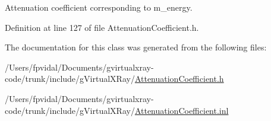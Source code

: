 Attenuation coefficient corresponding to m\_\-energy. 



Definition at line 127 of file AttenuationCoefficient.h.



The documentation for this class was generated from the following files:\begin{DoxyCompactItemize}
\item 
/Users/fpvidal/Documents/gvirtualxray-\/code/trunk/include/gVirtualXRay/\hyperlink{_attenuation_coefficient_8h}{AttenuationCoefficient.h}\item 
/Users/fpvidal/Documents/gvirtualxray-\/code/trunk/include/gVirtualXRay/\hyperlink{_attenuation_coefficient_8inl}{AttenuationCoefficient.inl}\end{DoxyCompactItemize}
